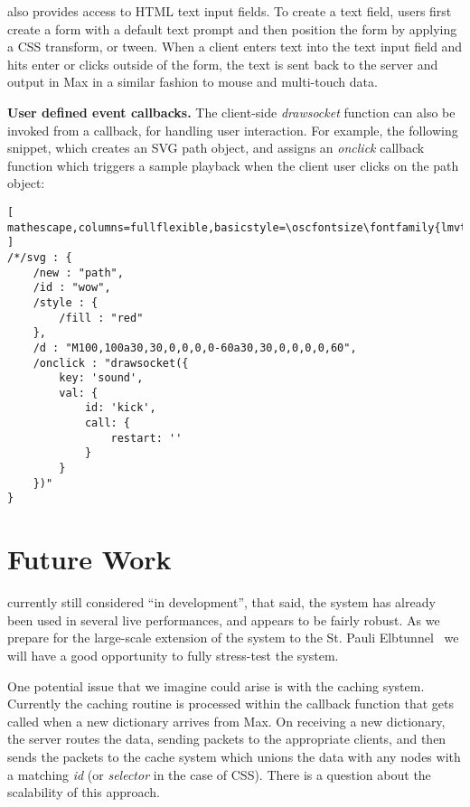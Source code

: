 \drawsocket also provides access to HTML text input fields. To create a text field, users first create a form with a default text prompt and then position the form by applying a CSS transform, or tween. When a client enters text into the text input field and hits enter or clicks outside of the form, the text is sent back to the server and output in Max in a similar fashion to mouse and multi-touch data.

\medskip
\noindent
\textbf{User defined event callbacks.}
The client-side \textit{drawsocket} function can also be invoked from a callback, for handling user interaction. For example, the following snippet, which creates an SVG path object, and assigns an \textit{onclick} callback function which triggers a sample playback when the client user clicks on the path object:

\begin{lstlisting}[ mathescape,columns=fullflexible,basicstyle=\oscfontsize\fontfamily{lmvtt}\selectfont ]
/*/svg : {
    /new : "path",
    /id : "wow",
    /style : {
        /fill : "red"
    },
    /d : "M100,100a30,30,0,0,0,0-60a30,30,0,0,0,0,60",
    /onclick : "drawsocket({
        key: 'sound',
        val: {
            id: 'kick',
            call: { 
                restart: '' 
            }
        }
    })"
}
\end{lstlisting}

%


\section{Future Work}

\drawsocket currently still considered ``in development'', that said, the system has already been used in several live performances, and appears to be fairly robust.
As we prepare for the large-scale extension of the system to the St. Pauli Elbtunnel~\cite{elbtunnel19} we will have a good opportunity to fully stress-test the system.

One potential issue that we imagine could arise is with the caching system. 
Currently the caching routine is processed within the callback function that gets called when a new dictionary arrives from Max.
On receiving a new dictionary, the server routes the data, sending packets to the appropriate clients, and then sends the packets to the cache system which unions the data with any nodes with a matching \textit{id} (or \textit{selector} in the case of CSS).
There is a question about the scalability of this approach. 

